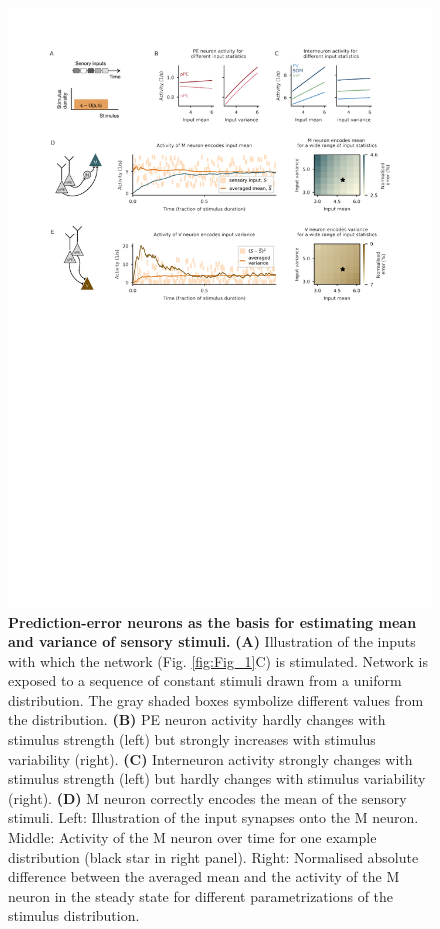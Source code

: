 \documentclass[10pt,a4paper]{article}
\begin{document}
\begin{figure}[t!]
	\centering
    \includegraphics[width=1\linewidth]{../results/figures/final/Fig_2}
\caption{\footnotesize{\bf Prediction-error neurons as the basis for estimating mean and variance of sensory stimuli.\newline} 
{\bf (A)} Illustration of the inputs with which the network (Fig. \ref{fig:Fig_1}C) is stimulated. Network is exposed to a sequence of constant stimuli drawn from a uniform distribution. The gray shaded boxes symbolize different values from the distribution.
{\bf (B)} PE neuron activity hardly changes with stimulus strength (left) but strongly increases with stimulus variability (right).
{\bf (C)} Interneuron activity strongly changes with stimulus strength (left) but hardly changes with stimulus variability (right).
{\bf (D)} M neuron correctly encodes the mean of the sensory stimuli. Left: Illustration of the input synapses onto the M neuron. Middle: Activity of the M neuron over time for one example distribution (black star in right panel). Right: Normalised absolute difference between the averaged mean and the activity of the M neuron in the steady state for different parametrizations of the stimulus distribution.
}
\end{figure}
\end{document}
